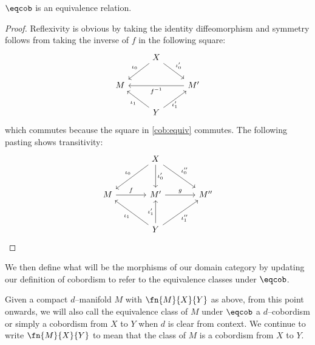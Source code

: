 \begin{thm}
$\eqcob$ is an equivalence relation.
\end{thm}
\begin{proof}
Reflexivity is obvious by taking the identity diffeomorphism and symmetry
follows from taking the inverse of $f$ in the following square:
\[\begin{tikzcd}
  & X \arrow{dl}[above, xshift=-5pt]{\iota_0} \arrow[dr, "\iota_0'"] & \\
  M & & M' \arrow[ll, "f^{-1}"] \\
  & Y \arrow[ul, "\iota_1"] \arrow[ur, "\iota_1'" below] &
\end{tikzcd}\]
which commutes because the square in \ref{cob:equiv} commutes. The following
pasting shows transitivity:
\[\begin{tikzcd}[row sep=large, column sep=large]
  & X
    \arrow{dl}[above, xshift=-5pt]{\iota_0}
    \arrow[d, "\iota_0'"]
    \arrow[dr, "\iota_0''"] &\\
  M \arrow[r, "f"] & M' \arrow[r, "g"] & M''\\
  & Y
    \arrow[ul, "\iota_1"]
    \arrow[u, "\iota_1'"]
    \arrow{ur}[below, xshift=5pt]{\iota_1''} &
\end{tikzcd}\]
\end{proof}

We then define what will be the morphisms of our domain category by updating our
definition of cobordism to refer to the equivalence classes under
$\eqcob$.
\begin{defn}
Given a compact $d$--manifold $M$ with $\fn{M}{X}{Y}$ as above, from this point
onwards, we will also call the equivalence class of $M$ under $\eqcob$ a
$d$--cobordism or simply a cobordism from $X$ to $Y$ when $d$ is clear from
context. We continue to write $\fn{M}{X}{Y}$ to mean that the class of $M$ is a
cobordism from $X$ to $Y$.
\end{defn}

